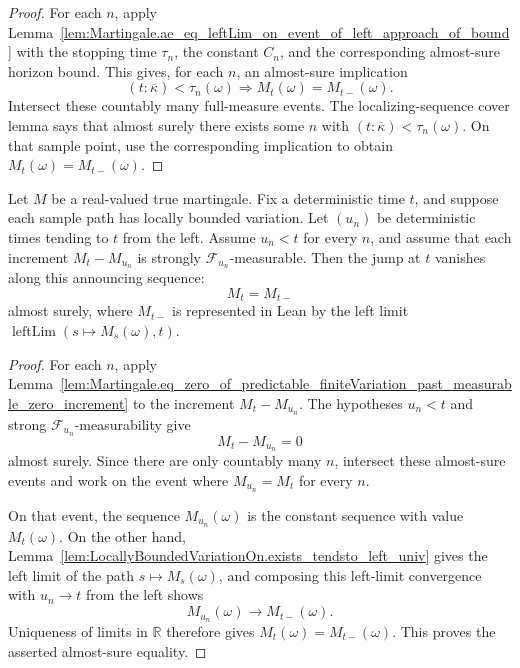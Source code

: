 \begin{proof}
For each \(n\), apply
Lemma~\ref{lem:Martingale.ae_eq_leftLim_on_event_of_left_approach_of_bound}
with the stopping time \(\tau_n\), the constant \(C_n\), and the corresponding
almost-sure horizon bound.  This gives, for each \(n\), an almost-sure
implication
\[
  (t:\overline{\kappa})<\tau_n(\omega)
  \Longrightarrow
  M_t(\omega)=M_{t-}(\omega).
\]
Intersect these countably many full-measure events.  The localizing-sequence
cover lemma says that almost surely there exists some \(n\) with
\((t:\overline{\kappa})<\tau_n(\omega)\).  On that sample point, use the
corresponding implication to obtain \(M_t(\omega)=M_{t-}(\omega)\).
\end{proof}

\begin{lemma}\label{lem:Martingale.ae_eq_leftLim_of_left_approach_past_measurable_increments}
Let \(M\) be a real-valued true martingale.  Fix a deterministic time \(t\),
and suppose each sample path has locally bounded variation.  Let
\((u_n)\) be deterministic times tending to \(t\) from the left.  Assume
\(u_n<t\) for every \(n\), and assume that each increment
\(M_t-M_{u_n}\) is strongly \(\mathcal F_{u_n}\)-measurable.  Then the jump
at \(t\) vanishes along this announcing sequence:
\[
  M_t=M_{t-}
\]
almost surely, where \(M_{t-}\) is represented in Lean by the left limit
\(\operatorname{leftLim}(s\mapsto M_s(\omega),t)\).
\end{lemma}

\begin{proof}
For each \(n\), apply
Lemma~\ref{lem:Martingale.eq_zero_of_predictable_finiteVariation_past_measurable_zero_increment}
to the increment \(M_t-M_{u_n}\).  The hypotheses \(u_n<t\) and strong
\(\mathcal F_{u_n}\)-measurability give
\[
  M_t-M_{u_n}=0
\]
almost surely.  Since there are only countably many \(n\), intersect these
almost-sure events and work on the event where \(M_{u_n}=M_t\) for every
\(n\).

On that event, the sequence \(M_{u_n}(\omega)\) is the constant sequence with
value \(M_t(\omega)\).  On the other hand,
Lemma~\ref{lem:LocallyBoundedVariationOn.exists_tendsto_left_univ} gives the
left limit of the path \(s\mapsto M_s(\omega)\), and composing this left-limit
convergence with \(u_n\to t\) from the left shows
\[
  M_{u_n}(\omega)\to M_{t-}(\omega).
\]
Uniqueness of limits in \(\mathbb R\) therefore gives
\(M_t(\omega)=M_{t-}(\omega)\).  This proves the asserted almost-sure
equality.
\end{proof}


